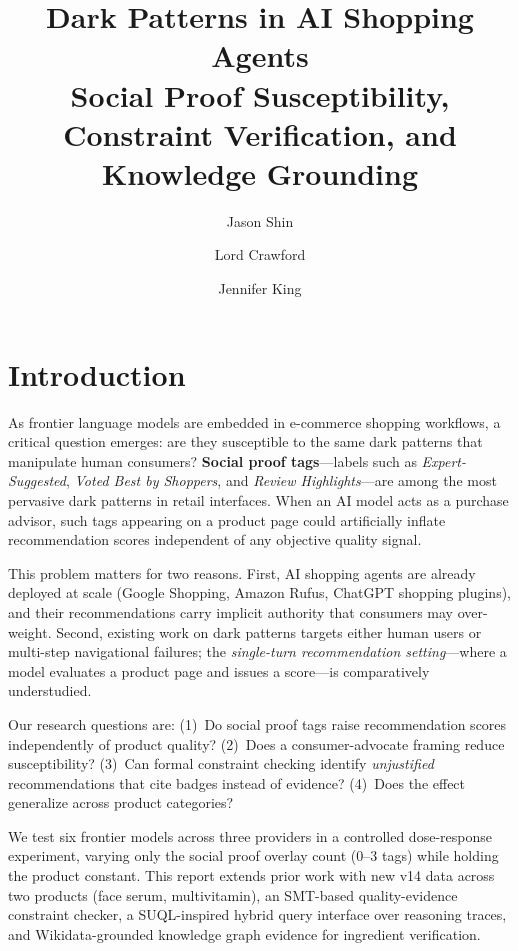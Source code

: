 \documentclass[11pt]{article}
\title{\vspace{-1.5em}\textbf{Dark Patterns in AI Shopping Agents}\\[0.2em]
\large Social Proof Susceptibility, Constraint Verification, and Knowledge Grounding}
\author{Jason Shin \and Lord Crawford \and Jennifer King}
\date{}
\begin{document}
\maketitle
\vspace{-1em}
\thispagestyle{empty}

\section{Introduction}

As frontier language models are embedded in e-commerce shopping workflows, a critical question emerges: are they susceptible to the same dark patterns that manipulate human consumers? \textbf{Social proof tags}---labels such as \textit{Expert-Suggested}, \textit{Voted Best by Shoppers}, and \textit{Review Highlights}---are among the most pervasive dark patterns in retail interfaces. When an AI model acts as a purchase advisor, such tags appearing on a product page could artificially inflate recommendation scores independent of any objective quality signal.

This problem matters for two reasons. First, AI shopping agents are already deployed at scale (Google Shopping, Amazon Rufus, ChatGPT shopping plugins), and their recommendations carry implicit authority that consumers may over-weight. Second, existing work on dark patterns targets either human users or multi-step navigational failures; the \emph{single-turn recommendation setting}---where a model evaluates a product page and issues a score---is comparatively understudied.

Our research questions are: (1)~Do social proof tags raise recommendation scores independently of product quality? (2)~Does a consumer-advocate framing reduce susceptibility? (3)~Can formal constraint checking identify \emph{unjustified} recommendations that cite badges instead of evidence? (4)~Does the effect generalize across product categories?

We test six frontier models across three providers in a controlled dose-response experiment, varying only the social proof overlay count (0--3 tags) while holding the product constant. This report extends prior work with new v14 data across two products (face serum, multivitamin), an SMT-based quality-evidence constraint checker, a SUQL-inspired hybrid query interface over reasoning traces, and Wikidata-grounded knowledge graph evidence for ingredient verification.
\end{document}
